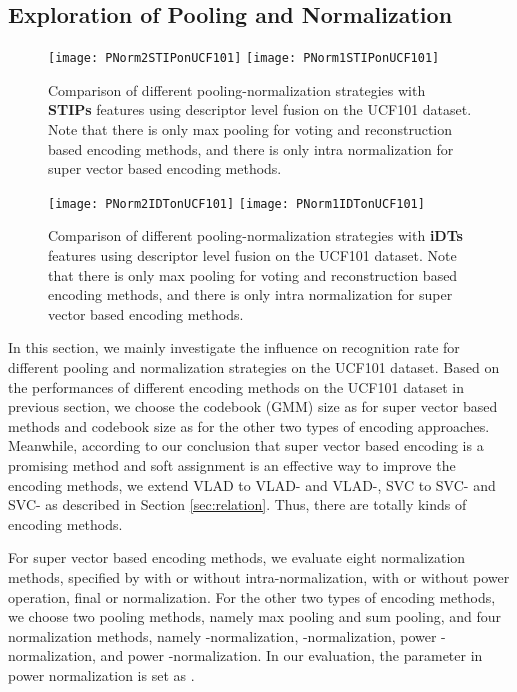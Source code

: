 \documentclass[twocolumn]{svjour3}          \smartqed  \usepackage{slashbox}
\begin{document}
\subsection{Exploration of Pooling and Normalization}
\label{sec:poolingnorm}
\begin{figure*}
  \center
\texttt{[image: PNorm2STIPonUCF101]}
\texttt{[image: PNorm1STIPonUCF101]}
  \caption{Comparison of different pooling-normalization strategies with \textbf{STIPs} features using descriptor level fusion on the UCF101 dataset. Note that there is only max pooling for voting and reconstruction based encoding methods, and there is only intra normalization for super vector based encoding methods.}
  \label{fig:PoolNorm1}
\end{figure*}
\begin{figure*}
  \center
\texttt{[image: PNorm2IDTonUCF101]}
\texttt{[image: PNorm1IDTonUCF101]}
  \caption{Comparison of different pooling-normalization strategies with \textbf{iDTs} features using descriptor level fusion on the UCF101 dataset. Note that there is only max pooling for voting and reconstruction based encoding methods, and there is only intra normalization for super vector based encoding methods.}
  \label{fig:PoolNorm2}
\end{figure*}

In this section, we mainly investigate the influence on recognition rate for different pooling and normalization strategies on the UCF101 dataset. Based on the performances of different encoding methods on the UCF101 dataset in previous section, we choose the codebook (GMM) size as  for super vector based methods and codebook size as  for the other two types of encoding approaches. Meanwhile, according to our conclusion that super vector based encoding is a promising method and soft assignment is an effective way to improve the encoding methods, we extend VLAD to VLAD- and VLAD-, SVC to SVC- and SVC- as described in Section \ref{sec:relation}. Thus, there are totally  kinds of encoding methods.

For super vector based encoding methods, we evaluate eight normalization methods, specified by with or without intra-normalization, with or without power operation, final  or  normalization. For the other two types of encoding methods, we choose two pooling methods, namely max pooling and sum pooling, and four normalization methods, namely -normalization, -normalization, power -normalization, and power -normalization. In our evaluation, the parameter  in power normalization is set as .
\end{document}
